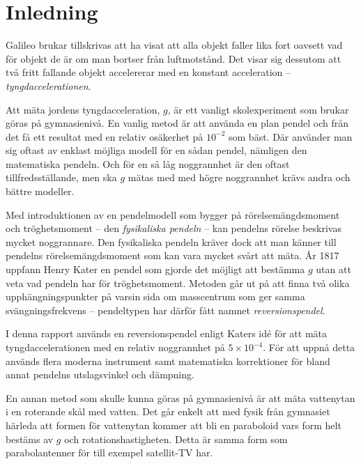 \documentclass[11pt,a4paper]{article}
\begin{document}
\begin{titlepage}
\begin{abstract}
\end{abstract}

\newpage
\renewcommand{\contentsname}{Innehållsförteckning}
\tableofcontents
\end{titlepage}

\setcounter{page}{1}

\section{Inledning}
Galileo brukar tillskrivas att ha visat att alla objekt faller lika fort oavsett vad för objekt de är om man bortser från luftmotstånd. Det visar sig dessutom att två fritt fallande objekt accelererar med en konstant acceleration -- \emph{tyngdaccelerationen}. 

Att mäta jordens tyngdacceleration, $g$, är ett vanligt skolexperiment som brukar göras på gymnasienivå. En vanlig metod är att använda en plan pendel och från det få ett resultat med en relativ osäkerhet på $10^{-2}$ som bäst. Där använder man sig oftast av enklast möjliga modell för en sådan pendel, nämligen den matematiska pendeln. Och för en så låg noggrannhet är den oftast tillfredsställande, men ska $g$ mätas med med högre noggrannhet krävs andra och bättre modeller.

Med introduktionen av en pendelmodell som bygger på rörelsemängdsmoment och tröghetsmoment -- den \emph{fysikaliska pendeln} -- kan pendelns rörelse beskrivas mycket noggrannare. Den fysikaliska pendeln kräver dock att man känner till pendelns rörelsemängdsmoment som kan vara mycket svårt att mäta. År 1817 uppfann Henry Kater en pendel som gjorde det möjligt att bestämma $g$ utan att veta vad pendeln har för tröghetsmoment\cite{wiki:katerpendel}. Metoden går ut på att finna två olika upphängningspunkter på varsin sida om masscentrum som ger samma svängningsfrekvens -- pendeltypen har därför fått namnet \emph{reversionspendel}.

I denna rapport används en reversionspendel enligt Katers idé för att mäta tyngdaccelerationen med en relativ noggrannhet på $5\times10^{-4}$. För att uppnå detta används flera moderna instrument samt matematiska korrektioner för bland annat pendelns utslagsvinkel och dämpning. 

En annan metod som skulle kunna göras på gymnasienivå är att mäta vattenytan i en roterande skål med vatten. Det går enkelt att med fysik från gymnasiet härleda att formen för vattenytan kommer att bli en paraboloid vars form helt bestäms av $g$ och rotationshastigheten. Detta är samma form som parabolantenner för till exempel satellit-TV har.
\end{document}
